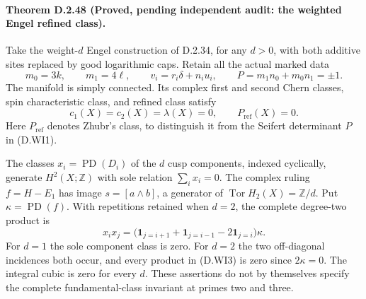 \paragraph{Theorem D.2.48 (Proved, pending independent audit: the weighted Engel refined class).}
Take the weight-$d$ Engel construction of D.2.34, for any $d>0$,
with both additive sites replaced by good logarithmic caps.  Retain
all the actual marked data
\[
 m_0=3k,\qquad m_1=4\ell,\qquad
 v_i=r_i\delta+n_i u_i,\qquad
 P=m_1n_0+m_0n_1=\pm1 .
 \tag{D.WI1}
\]
The manifold is simply connected.  Its complex first and second
Chern classes, spin characteristic class, and refined class satisfy
\[
 c_1(X)=c_2(X)=\lambda(X)=0,\qquad P_{\mathrm{ref}}(X)=0.
 \tag{D.WI2}
\]
Here $P_{\mathrm{ref}}$ denotes Zhubr's class, to distinguish it from
the Seifert determinant $P$ in (D.WI1).

The classes $x_i=\operatorname{PD}(D_i)$ of the $d$ cusp components,
indexed cyclically, generate $H^2(X;\mathbb Z)$ with sole relation
$\sum_i x_i=0$.  The complex ruling $f=H-E_1$ has image
$s=[a\wedge b]$, a generator of $\operatorname{Tor}H_2(X)=\mathbb Z/d$.
Put $\kappa=\operatorname{PD}(f)$.  With repetitions retained when
$d=2$, the complete degree-two product is
\[
 x_i x_j=
 \bigl(\mathbf1_{j=i+1}+\mathbf1_{j=i-1}-2\mathbf1_{j=i}\bigr)\kappa.
 \tag{D.WI3}
\]
For $d=1$ the sole component class is zero.  For $d=2$ the two
off-diagonal incidences both occur, and every product in (D.WI3)
is zero since $2\kappa=0$.  The integral cubic is zero for every $d$.
These assertions do not by themselves specify the complete
fundamental-class invariant at primes two and three.


